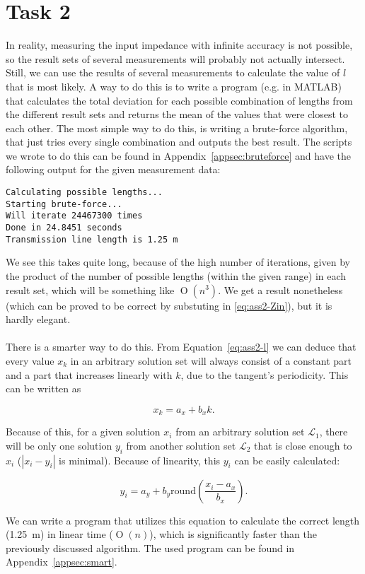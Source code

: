 \documentclass[11pt,titlepage]{report}
\begin{document}
\section{Task 2}
In reality, measuring the input impedance with infinite accuracy is not possible, so the result sets of several measurements will probably not actually intersect.
\\
Still, we can use the results of several measurements to calculate the value of $l$ that is most likely. A way to do this is to write a program (e.g. in MATLAB) that calculates the total deviation for each possible combination of lengths from the different result sets and returns the mean of the values that were closest to each other. The most simple way to do this, is writing a brute-force algorithm, that just tries every single combination and outputs the best result. The scripts we wrote to do this can be found in Appendix~\ref{appsec:bruteforce} and have the following output for the given measurement data:

\begin{verbatim}
Calculating possible lengths...
Starting brute-force...
Will iterate 24467300 times
Done in 24.8451 seconds
Transmission line length is 1.25 m
\end{verbatim}

We see this takes quite long, because of the high number of iterations, given by the product of the number of possible lengths (within the given range) in each result set, which will be something like $\operatorname{O}(n^3)$. We get a result nonetheless (which can be proved to be correct by substuting in \ref{eq:ass2-Zin}), but it is hardly elegant.
\\
\\
There is a smarter way to do this. From Equation~\ref{eq:ass2-l} we can deduce that every value $x_k$ in an arbitrary solution set will always consist of a constant part and a part that increases linearly with $k$, due to the tangent's periodicity. This can be written as

\begin{equation}
	x_k = a_x + b_x k.
\end{equation}

Because of this, for a given solution $x_i$ from an arbitrary solution set $\mathcal{L_1}$, there will be only one solution $y_i$ from another solution set $\mathcal{L_2}$ that is close enough to $x_i$ ($|x_i-y_i|$ is minimal). Because of linearity, this $y_i$ can be easily calculated:

\begin{equation}
	y_i = a_y + b_y \mathrm{round}\left(\frac{x_i-a_x}{b_x}\right).
\end{equation}

We can write a program that utilizes this equation to calculate the correct length (\SI{1.25}{m}) in linear time ($\operatorname{O}(n)$), which is significantly faster than the previously discussed algorithm. The used program can be found in Appendix~\ref{appsec:smart}.

	
\end{document}
